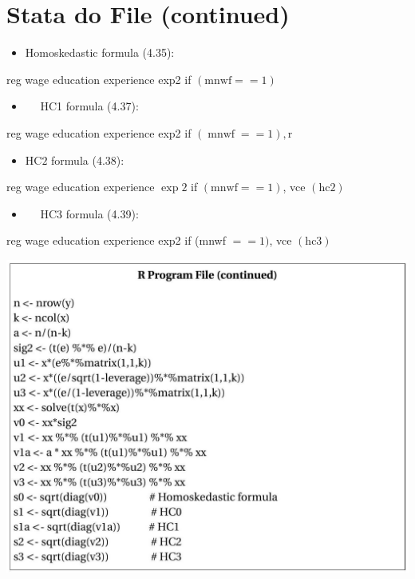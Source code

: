 \documentclass[10pt]{article}
\begin{document}
\section{Stata do File (continued)}
\begin{itemize}
  \item Homoskedastic formula (4.35):
\end{itemize}
reg wage education experience exp2 if $(\mathrm{mnwf}==1)$

\begin{itemize}
  \item $\quad$ HC1 formula (4.37):
\end{itemize}
reg wage education experience exp2 if $(\operatorname{mnwf}==1), \mathrm{r}$

\begin{itemize}
  \item $\mathrm{HC} 2$ formula (4.38):
\end{itemize}
reg wage education experience $\exp 2$ if $(\mathrm{mnwf}==1)$, vce $(\mathrm{hc} 2)$

\begin{itemize}
  \item $\quad$ HC3 formula (4.39):
\end{itemize}
reg wage education experience exp2 if (mnwf $==1)$, vce $(\mathrm{hc} 3)$

\includegraphics[max width=\textwidth]{2022_09_17_46fafb30295495354ae2g-23}
\end{document}
